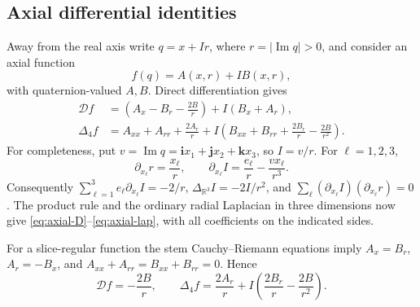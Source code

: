 \documentclass[11pt,a4paper]{article}
\numberwithin{equation}{section}
\theoremstyle{definition}
\theoremstyle{remark}
\newcommand{\R}{\mathbb R}
\newcommand{\ii}{\mathbf i}
\newcommand{\jj}{\mathbf j}
\newcommand{\kk}{\mathbf k}
\newcommand{\Ima}{\operatorname{Im}}
\newcommand{\cD}{\mathcal D}
\newcommand{\lap}{\Delta_4}
\begin{document}
\subsection{Axial differential identities}
Away from the real axis write $q=x+Ir$, where $r=|\Ima q|>0$, and consider
an axial function
\[
 f(q)=A(x,r)+I B(x,r),
\]
with quaternion-valued $A,B$. Direct differentiation gives
\begin{align}
 \cD f
   &=\left(A_x-B_r-\frac{2B}{r}\right)+I(B_x+A_r),
      \label{eq:axial-D}\\
 \lap f
   &=A_{xx}+A_{rr}+\frac{2A_r}{r}
      +I\left(B_{xx}+B_{rr}+\frac{2B_r}{r}-\frac{2B}{r^2}\right).
      \label{eq:axial-lap}
\end{align}
For completeness, put $v=\Ima q=\ii x_1+\jj x_2+\kk x_3$, so $I=v/r$.
For $\ell=1,2,3$,
\[
 \partial_{x_\ell}r=\frac{x_\ell}{r},\qquad
 \partial_{x_\ell}I=\frac{e_\ell}{r}-\frac{v x_\ell}{r^3}.
\]
Consequently $\sum_{\ell=1}^3e_\ell\partial_{x_\ell}I=-2/r$,
$\Delta_{\R^3}I=-2I/r^2$, and
$\sum_\ell(\partial_{x_\ell}I)(\partial_{x_\ell}r)=0$.
The product rule and the ordinary radial Laplacian in three dimensions now
give \eqref{eq:axial-D}--\eqref{eq:axial-lap}, with all coefficients on the
indicated sides.

For a slice-regular function the stem Cauchy--Riemann equations imply
$A_x=B_r$, $A_r=-B_x$, and $A_{xx}+A_{rr}=B_{xx}+B_{rr}=0$. Hence
\begin{equation}\label{eq:slice-D-lap}
 \cD f=-\frac{2B}{r},\qquad
 \lap f=\frac{2A_r}{r}
       +I\left(\frac{2B_r}{r}-\frac{2B}{r^2}\right).
\end{equation}
\end{document}
